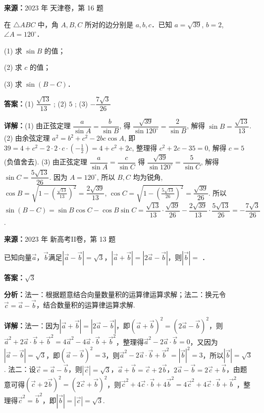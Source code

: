 \begin{question}[points=14]
\textbf{来源：}2023 年 天津卷，第 16 题\par
在 $\triangle ABC$ 中，角 $A, B, C$ 所对的边分别是 $a, b, c$．已知 $a = \sqrt{39}$, $b = 2$, $\angle A = 120^\circ$．

(1) 求 $\sin B$ 的值；

(2) 求 $c$ 的值；

(3) 求 $\sin(B - C)$．
\begin{solution}
\textbf{答案：}(1) $\dfrac{\sqrt{13}}{13}$ ; (2) $5$ ; (3) $-\dfrac{7\sqrt{3}}{26}$

\textbf{详解：}(1) 由正弦定理 $\dfrac{a}{\sin A} = \dfrac{b}{\sin B}$, 得 $\dfrac{\sqrt{39}}{\sin120^\circ} = \dfrac{2}{\sin B}$, 解得 $\sin B = \dfrac{\sqrt{13}}{13}$.
(2) 由余弦定理 $a^2 = b^2 + c^2 - 2bc\cos A$, 即 $39 = 4 + c^2 - 2\cdot 2 \cdot c \cdot \left(-\frac{1}{2}\right) = 4 + c^2 + 2c$, 整理得 $c^2 + 2c - 35 = 0$, 解得 $c = 5$ (负值舍去).
(3) 由正弦定理 $\dfrac{a}{\sin A} = \dfrac{c}{\sin C}$ 得 $\dfrac{\sqrt{39}}{\sin120^\circ} = \dfrac{5}{\sin C}$, 解得 $\sin C = \dfrac{5\sqrt{13}}{26}$. 因为 $A = 120^\circ$, 所以 $B, C$ 均为锐角, $\cos B = \sqrt{1-\left(\frac{\sqrt{13}}{13}\right)^2} = \dfrac{2\sqrt{39}}{13}$, $\cos C = \sqrt{1-\left(\frac{5\sqrt{13}}{26}\right)^2} = \dfrac{\sqrt{39}}{26}$. 所以 $\sin(B-C) = \sin B \cos C - \cos B \sin C = \dfrac{\sqrt{13}}{13} \cdot \dfrac{\sqrt{39}}{26} - \dfrac{2\sqrt{39}}{13} \cdot \dfrac{5\sqrt{13}}{26} = -\dfrac{7\sqrt{3}}{26}$.
\end{solution}
\end{question}

\begin{question}[points=5]
\textbf{来源：}2023 年 新高考II卷，第 13 题\par
已知向量$\vec{a}$，$\vec{b}$满足$|\vec{a}-\vec{b}|=\sqrt{3}$，$|\vec{a}+\vec{b}|=|2\vec{a}-\vec{b}|$，则$|\vec{b}|=$ ．
\fillin[{$\sqrt{3}$}]
\begin{solution}
\textbf{答案：}$\sqrt{3}$

\textbf{分析：}法一：根据题意结合向量数量积的运算律运算求解；法二：换元令$\vec{c}=\vec{a}-\vec{b}$，结合数量积的运算律运算求解.

\textbf{详解：}法一：因为$|\vec{a}+\vec{b}|=|2\vec{a}-\vec{b}|$，即$(\vec{a}+\vec{b})^{2}=(2\vec{a}-\vec{b})^{2}$，则$\vec{a}^{2}+2\vec{a}\cdot\vec{b}+\vec{b}^{2}=4\vec{a}^{2}-4\vec{a}\cdot\vec{b}+\vec{b}^{2}$，整理得$\vec{a}^{2}-2\vec{a}\cdot\vec{b}=0$，又因为$|\vec{a}-\vec{b}|=\sqrt{3}$，即$(\vec{a}-\vec{b})^{2}=3$，则$\vec{a}^{2}-2\vec{a}\cdot\vec{b}+\vec{b}^{2}=|\vec{b}|^{2}=3$，所以$|\vec{b}|=\sqrt{3}$.
法二：设$\vec{c}=\vec{a}-\vec{b}$，则$|\vec{c}|=\sqrt{3}$，$\vec{a}+\vec{b}=\vec{c}+2\vec{b}$，$2\vec{a}-\vec{b}=2\vec{c}+\vec{b}$，由题意可得$(\vec{c}+2\vec{b})^{2}=(2\vec{c}+\vec{b})^{2}$，则$\vec{c}^{2}+4\vec{c}\cdot\vec{b}+4\vec{b}^{2}=4\vec{c}^{2}+4\vec{c}\cdot\vec{b}+\vec{b}^{2}$，整理得$\vec{c}^{2}=\vec{b}^{2}$，即$|\vec{b}|=|\vec{c}|=\sqrt{3}$.
\end{solution}
\end{question}

